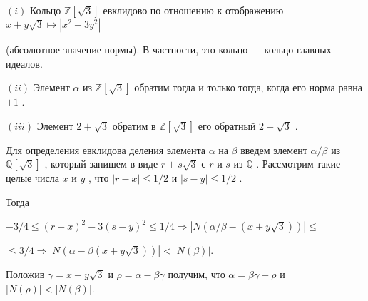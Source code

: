 \begin{lemma}

$(i)$ Кольцо $\mathbb{Z}[\sqrt 3]$
 евклидово по отношению к отображению $x+y\sqrt 3\mapsto |x^2 - 3y^2|$
 
(абсолютное значение нормы). В частности, это кольцо — 
кольцо главных идеалов. 

$(ii)$ Элемент $\alpha$
 из $\mathbb{Z}[\sqrt 3]$
 обратим тогда и только тогда, когда его 
норма равна $\pm 1$
. 

$(iii)$ Элемент $2+\sqrt 3$
 обратим в $\mathbb{Z}[\sqrt 3]$
 его обратный $2-\sqrt 3$
 . 
\end{lemma}
\begin{myproof}
 Для определения евклидова деления элемента $\alpha$
 на $\beta$
 введем элемент 
$\alpha/\beta$
 из $\mathbb{Q}[\sqrt 3]$
 , который запишем в виде $r +s\sqrt 3$ с $r$ и $s$ из $\mathbb{Q}$ 
. Рассмотрим такие целые числа $x$
 и $y$
 , что $|r-x|\leqslant 1/2$ и $|s-y|\leqslant 1/2$
.

\newpage

Тогда 

\begin{center}
$-3/4 \leqslant (r-x)^2 - 3(s-y)^2 \leqslant 1/4\Rightarrow |N(\alpha/\beta - (x+y\sqrt 3))| \leqslant$

$\leqslant 3/4\Rightarrow |N(\alpha - \beta(x+y\sqrt 3))| < |N(\beta)|$.
\end{center}


Положив $\gamma = x +y\sqrt 3$ и $\rho = \alpha - \beta\gamma$
 получим, что $\alpha = \beta\gamma + \rho$
 и $|N(\rho)| < |N(\beta)|$.
\end{myproof}

